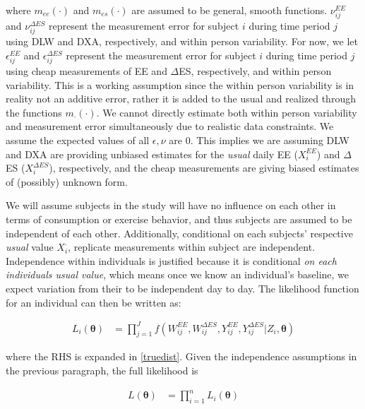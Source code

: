 \documentclass[11pt]{article}\usepackage[]{graphicx}\usepackage[]{color}
\begin{document}
where $m_{ee}(\cdot)$ and $m_{es}(\cdot)$ are assumed to be general, smooth functions. $\nu_{ij}^{EE}$ and $\nu_{ij}^{\Delta ES}$ represent the measurement error for subject $i$ during time period $j$ using DLW and DXA, respectively, and within person variability. For now, we let $\epsilon_{ij}^{EE}$ and $\epsilon_{ij}^{\Delta ES}$ represent the measurement error for subject $i$ during time period $j$ using cheap measurements of EE and $\Delta$ES, respectively, and within person variability. This is a working assumption since the within person variability is in reality not an additive error, rather it is added to the usual and realized through the functions $m_{\cdot}(\cdot)$. We cannot directly estimate both within person variability and measurement error simultaneously due to realistic data constraints.  We assume the expected values of all $\epsilon,\nu$ are 0. This implies we are assuming DLW and DXA are providing unbiased estimates for the \emph{usual} daily EE ($X_i^{EE}$) and $\Delta$ES ($X_i^{\Delta ES}$), respectively, and the cheap measurements are giving biased estimates of (possibly) unknown form.


We will assume subjects in the study will have no influence on each other in terms of consumption or exercise behavior, and thus subjects are assumed to be independent of each other. Additionally, conditional on each subjects' respective \emph{usual} value $X_i^{\cdot}$, replicate measurements within subject are independent. Independence within individuals is justified because it is conditional \emph{on each individuals usual value}, which means once we know an individual's baseline, we expect variation from their to be independent day to day. The likelihood function for an individual can then be written as:

\begin{align}
  L_i(\boldsymbol{\theta}) &= \prod_{j=1}^{J} f(W_{ij}^{EE},W_{ij}^{\Delta ES}, Y_{ij}^{EE},Y_{ij}^{\Delta ES}|Z_i,\boldsymbol{\theta}) 
\end{align}

where the RHS is expanded in \eqref{truedist}. Given the independence assumptions in the previous paragraph,  the full likelihood is

\begin{align}
  L(\boldsymbol{\theta}) &= \prod_{i=1}^{n}  L_i(\boldsymbol{\theta}) 
\end{align}



\end{document}
